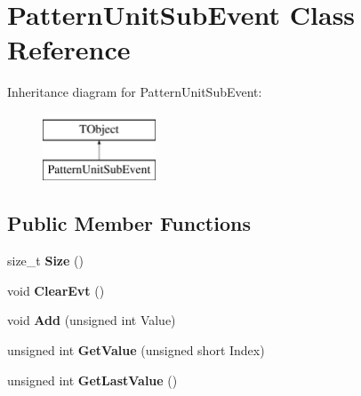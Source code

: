 \hypertarget{class_pattern_unit_sub_event}{\section{Pattern\-Unit\-Sub\-Event Class Reference}
\label{class_pattern_unit_sub_event}
}
Inheritance diagram for Pattern\-Unit\-Sub\-Event\-:\begin{figure}[H]
\begin{center}
\leavevmode
\includegraphics[height=2.000000cm]{class_pattern_unit_sub_event}
\end{center}
\end{figure}
\subsection*{Public Member Functions}
\begin{DoxyCompactItemize}
\item 
\hypertarget{class_pattern_unit_sub_event_aba30013326ba5858d57f134d89ea3669}{size\-\_\-t {\bfseries Size} ()}\label{class_pattern_unit_sub_event_aba30013326ba5858d57f134d89ea3669}

\item 
\hypertarget{class_pattern_unit_sub_event_ae24f02b44fdad9608018c4df754121f1}{void {\bfseries Clear\-Evt} ()}\label{class_pattern_unit_sub_event_ae24f02b44fdad9608018c4df754121f1}

\item 
\hypertarget{class_pattern_unit_sub_event_ab9650520294b06b3355072b18908199b}{void {\bfseries Add} (unsigned int Value)}\label{class_pattern_unit_sub_event_ab9650520294b06b3355072b18908199b}

\item 
\hypertarget{class_pattern_unit_sub_event_a23ec29db91688feaa0de22ca730e8a77}{unsigned int {\bfseries Get\-Value} (unsigned short Index)}\label{class_pattern_unit_sub_event_a23ec29db91688feaa0de22ca730e8a77}

\item 
\hypertarget{class_pattern_unit_sub_event_a7890f56b171c95b7d90c0f9932bfc879}{unsigned int {\bfseries Get\-Last\-Value} ()}\label{class_pattern_unit_sub_event_a7890f56b171c95b7d90c0f9932bfc879}

\end{DoxyCompactItemize}
